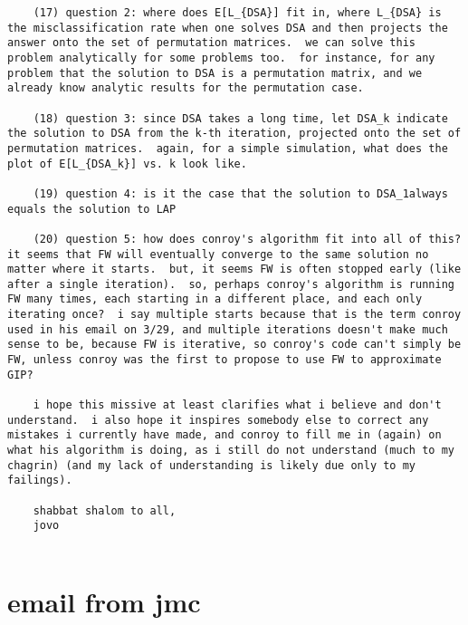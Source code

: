 \begin{verbatim}
	(17) question 2: where does E[L_{DSA}] fit in, where L_{DSA} is the misclassification rate when one solves DSA and then projects the answer onto the set of permutation matrices.  we can solve this problem analytically for some problems too.  for instance, for any problem that the solution to DSA is a permutation matrix, and we already know analytic results for the permutation case.

	(18) question 3: since DSA takes a long time, let DSA_k indicate the solution to DSA from the k-th iteration, projected onto the set of permutation matrices.  again, for a simple simulation, what does the plot of E[L_{DSA_k}] vs. k look like.

	(19) question 4: is it the case that the solution to DSA_1always equals the solution to LAP

	(20) question 5: how does conroy's algorithm fit into all of this? it seems that FW will eventually converge to the same solution no matter where it starts.  but, it seems FW is often stopped early (like after a single iteration).  so, perhaps conroy's algorithm is running FW many times, each starting in a different place, and each only iterating once?  i say multiple starts because that is the term conroy used in his email on 3/29, and multiple iterations doesn't make much sense to be, because FW is iterative, so conroy's code can't simply be FW, unless conroy was the first to propose to use FW to approximate GIP?

	i hope this missive at least clarifies what i believe and don't understand.  i also hope it inspires somebody else to correct any mistakes i currently have made, and conroy to fill me in (again) on what his algorithm is doing, as i still do not understand (much to my chagrin) (and my lack of understanding is likely due only to my failings).

	shabbat shalom to all,
	jovo
	
\end{verbatim}

\section{email from jmc}

